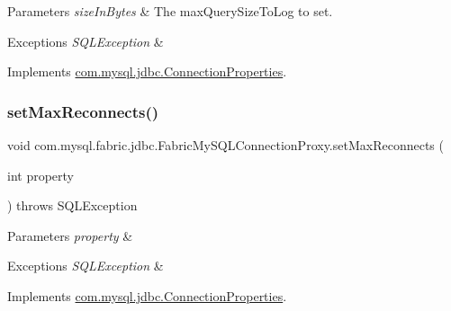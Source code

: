 \begin{DoxyParams}{Parameters}
{\em size\+In\+Bytes} & The max\+Query\+Size\+To\+Log to set. \\
\hline
\end{DoxyParams}

\begin{DoxyExceptions}{Exceptions}
{\em S\+Q\+L\+Exception} & \\
\hline
\end{DoxyExceptions}


Implements \mbox{\hyperlink{interfacecom_1_1mysql_1_1jdbc_1_1_connection_properties_a65e15e4e1644fe1fb818777977237944}{com.\+mysql.\+jdbc.\+Connection\+Properties}}.

\mbox{\label{classcom_1_1mysql_1_1fabric_1_1jdbc_1_1_fabric_my_s_q_l_connection_proxy_a1180c8ed7ee4dd067add13f5f7d096e4}} 
\subsubsection{\texorpdfstring{set\+Max\+Reconnects()}{setMaxReconnects()}}
{\footnotesize\ttfamily void com.\+mysql.\+fabric.\+jdbc.\+Fabric\+My\+S\+Q\+L\+Connection\+Proxy.\+set\+Max\+Reconnects (\begin{DoxyParamCaption}\item[{int}]{property }\end{DoxyParamCaption}) throws S\+Q\+L\+Exception}


\begin{DoxyParams}{Parameters}
{\em property} & \\
\hline
\end{DoxyParams}

\begin{DoxyExceptions}{Exceptions}
{\em S\+Q\+L\+Exception} & \\
\hline
\end{DoxyExceptions}


Implements \mbox{\hyperlink{interfacecom_1_1mysql_1_1jdbc_1_1_connection_properties_aa4dbdf7b74fc014b67992de0cf9247c9}{com.\+mysql.\+jdbc.\+Connection\+Properties}}.


